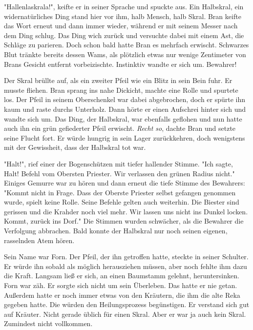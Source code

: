 \documentclass[10pt, a4paper, oneside]{book}
\begin{document}
\begin{multicols}{2}
"Hallenlaskrala!", keifte er in seiner Sprache und spuckte aus. Ein Halbskral, ein widernatürliches Ding stand hier vor ihm, halb Mensch, halb Skral. Bran keifte das Wort erneut und dann immer wieder, während er mit seinem Messer nach dem Ding schlug. Das Ding wich zurück und versuchte dabei mit einem Ast, die Schläge zu parieren. Doch schon bald hatte Bran es mehrfach erwischt. Schwarzes Blut tränkte bereits dessen Wams, als plötzlich etwas nur wenige Zentimeter von Brans Gesicht entfernt vorbeizischte. Instinktiv wandte er sich um. Bewahrer!

Der Skral brüllte auf, als ein zweiter Pfeil wie ein Blitz in sein Bein fuhr. Er musste fliehen. Bran sprang ins nahe Dickicht, machte eine Rolle und spurtete los. Der Pfeil in seinem Oberschenkel war dabei abgebrochen, doch er spürte ihn kaum und raste durchs Unterholz. Dann hörte er einen Aufschrei hinter sich und wandte sich um. Das Ding, der Halbskral, war ebenfalls geflohen und nun hatte auch ihn ein grün gefiederter Pfeil erwischt. \textit{Recht so}, dachte Bran und setzte seine Flucht fort. Er würde hungrig in sein Lager zurückkehren, doch wenigstens mit der Gewissheit, dass der Halbskral tot war.

"Halt!", rief einer der Bogenschützen mit tiefer hallender Stimme. "Ich sagte, Halt! Befehl vom Obersten Priester. Wir verlassen den grünen Radius nicht." Einiges Gemurre war zu hören und dann erneut die tiefe Stimme des Bewahrers: "Kommt nicht in Frage. Dass der Oberste Priester selbst gefangen genommen wurde, spielt keine Rolle. Seine Befehle gelten auch weiterhin. Die Biester sind gerissen und die Krahder noch viel mehr. Wir lassen uns nicht ins Dunkel locken. Kommt, zurück ins Dorf." Die Stimmen wurden schwächer, als die Bewahrer die Verfolgung abbrachen. Bald konnte der Halbskral nur noch seinen eigenen, rasselnden Atem hören. 

Sein Name war Forn. Der Pfeil, der ihn getroffen hatte, steckte in seiner Schulter. Er würde ihn sobald als möglich herausziehen müssen, aber noch fehlte ihm dazu die Kraft. Langsam ließ er sich, an einen Baumstamm gelehnt, heruntersinken. Forn war zäh. Er sorgte sich nicht um sein Überleben. Das hatte er nie getan. Außerdem hatte er noch immer etwas von den Kräutern, die ihm die alte Reka gegeben hatte. Die würden den Heilungsprozess begünstigen. Er verstand sich gut auf Kräuter. Nicht gerade üblich für einen Skral. Aber er war ja auch kein Skral. Zumindest nicht vollkommen. 


\end{multicols}
\end{document}

